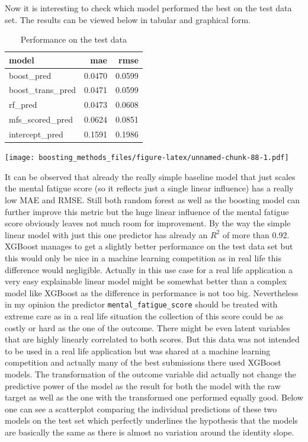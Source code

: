 \documentclass[
]{book}
\begin{document}
Now it is interesting to check which model performed the best on the test data set. The results can be viewed below in tabular and graphical form.

\begin{table}

\caption{\label{tab:perfBurn}Performance on the test data}
\centering
\begin{tabular}[t]{lrr}
\toprule
model & mae & rmse\\
\midrule
boost\_pred & 0.0470 & 0.0599\\
boost\_trans\_pred & 0.0471 & 0.0599\\
rf\_pred & 0.0473 & 0.0608\\
mfs\_scored\_pred & 0.0624 & 0.0851\\
intercept\_pred & 0.1591 & 0.1986\\
\bottomrule
\end{tabular}
\end{table}

\texttt{[image: boosting\_methods\_files/figure-latex/unnamed-chunk-88-1.pdf]}

It can be observed that already the really simple baseline model that just scales the mental fatigue score (so it reflects just a single linear influence) has a really low MAE and RMSE. Still both random forest as well as the boosting model can further improve this metric but the huge linear influence of the mental fatigue score obviously leaves not much room for improvement. By the way the simple linear model with just this one predictor has already an \(R^2\) of more than 0.92. XGBoost manages to get a slightly better performance on the test data set but this would only be nice in a machine learning competition as in real life this difference would negligible. Actually in this use case for a real life application a very easy explainable linear model might be somewhat better than a complex model like XGBoost as the difference in performance is not too big. Nevertheless in my opinion the predictor \texttt{mental\_fatigue\_score} should be treated with extreme care as in a real life situation the collection of this score could be as costly or hard as the one of the outcome. There might be even latent variables that are highly linearly correlated to both scores. But this data was not intended to be used in a real life application but was shared at a machine learning competition and actually many of the best submissions there used XGBoost models. The transformation of the outcome variable did actually not change the predictive power of the model as the result for both the model with the raw target as well as the one with the transformed one performed equally good. Below one can see a scatterplot comparing the individual predictions of these two models on the test set which perfectly underlines the hypothesis that the models are basically the same as there is almost no variation around the identity slope.
\end{document}
